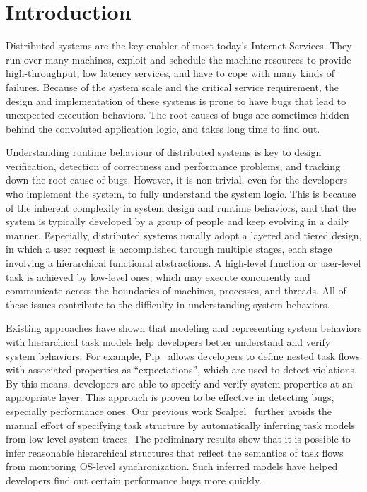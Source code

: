 
\section{Introduction}
\label{sec:intro}



Distributed systems are the key enabler of most
today's Internet Services. They run over many machines,
exploit and schedule the machine resources to provide 
high-throughput, low latency services, and have to cope 
with many kinds of failures. Because of the system scale
and the critical service requirement, the design and 
implementation of these systems is prone to have bugs
that lead to unexpected execution behaviors. 
The root causes of bugs are sometimes hidden behind
the convoluted application logic, and takes long time
to find out. 

Understanding runtime behaviour of distributed systems 
is key to design verification, detection of correctness
and performance problems, and tracking down the root cause
of bugs. However, it is non-trivial, even for the developers
who implement the system, to fully understand the system 
logic. This is because of the inherent complexity 
in system design and runtime behaviors, and that 
the system is typically developed by a group of people
and keep evolving in a daily manner.
Especially, distributed systems usually adopt a layered
and tiered design, in which a user request is accomplished
through multiple stages, each stage involving a hierarchical
functional abstractions. A high-level function or user-level
task is achieved by low-level ones, which may execute
concurently and communicate across the boundaries of machines, 
processes, and threads. All of these issues contribute to the
difficulty in understanding system behaviors.

Existing approaches have shown that modeling and representing
system behaviors with hierarchical task models help developers
better understand and verify system behaviors. For example,
Pip~\cite{} allows developers to define nested task flows
with associated properties as ``expectations'', which are used 
to detect violations.
By this means, developers are able to specify and verify 
system properties at an appropriate layer. This approach is 
proven to be effective in detecting bugs, especially 
performance ones. Our previous work Scalpel~\cite{}
further avoids the manual effort of specifying task structure
by automatically inferring task models from low level
system traces. The preliminary results show that it is 
possible to infer reasonable hierarchical structures that reflect
the semantics of task flows from monitoring OS-level synchronization.
Such inferred models have helped developers find out
certain performance bugs more quickly.

